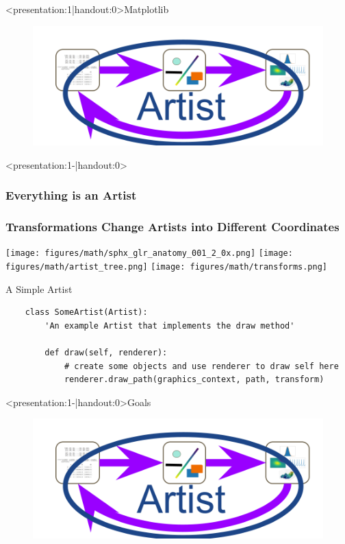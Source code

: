 \documentclass[xcolor={dvipsnames}]{beamer}
\begin{document}
\begin{frame}<presentation:1|handout:0>{Matplotlib}
    \begin{figure}
       \includegraphics[width=\linewidth]{figures/flow/artists.png}
    \end{figure}
\end{frame}


\begin{frame}<presentation:1-|handout:0>
    \frametitle<presentation:1-2|handout:0>{Everything is an Artist}
    \frametitle<presentation:3|handout:0>{Transformations Change Artists into Different Coordinates}
    \begin{overprint}
        \texttt{[image: figures/math/sphx\_glr\_anatomy\_001\_2\_0x.png]}
        \texttt{[image: figures/math/artist\_tree.png]}
        \texttt{[image: figures/math/transforms.png]}
    \end{overprint}
\end{frame}


\begin{frame}[fragile]{A Simple Artist}
\begin{verbatim}
    class SomeArtist(Artist):
        'An example Artist that implements the draw method'
    
        def draw(self, renderer):
            # create some objects and use renderer to draw self here
            renderer.draw_path(graphics_context, path, transform)
\end{verbatim}
\end{frame}

\begin{frame}<presentation:1-|handout:0>{Goals}
    \begin{figure}
        \includegraphics[width=\linewidth]{figures/flow/artists.png}
    \end{figure}
\end{frame}
\end{document}
